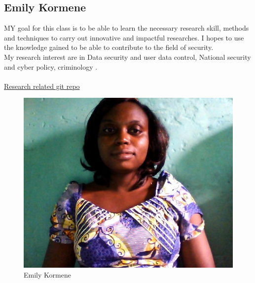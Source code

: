 \subsection{Emily Kormene}

MY goal for this class is to be able to learn the necessary research skill, methods and techniques to carry out innovative and impactful researches. I hopes to use the knowledge gained to be able to contribute to the field of security.\\

My research interest are in Data security and user data control, National security and cyber policy, criminology .\\\\

\href{https://github.com/brianlovin/security-checklist}{Research related git repo}

\begin{figure} [h]

\begin{center}

\includegraphics[scale=0.3]{Kormene.jpg}

\end{center}

\caption{Emily Kormene}

\end{figure}
